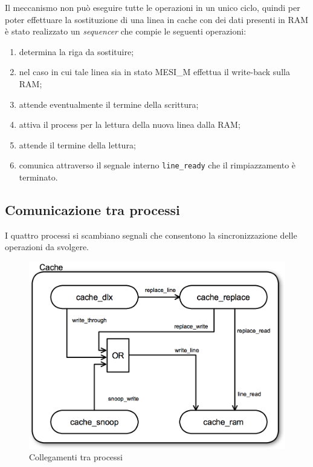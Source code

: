 Il meccanismo non pu\`o eseguire tutte le operazioni in un unico ciclo, quindi per poter effettuare la sostituzione di una linea in cache con dei dati presenti in RAM \`e stato realizzato un \emph{sequencer} che compie le seguenti operazioni:
\begin{enumerate}
  \item determina la riga da sostituire;
  \item nel caso in cui tale linea sia in stato MESI\_M effettua il write-back sulla RAM;
  \item attende eventualmente il termine della scrittura;
  \item attiva il process per la lettura della nuova linea dalla RAM;
  \item attende il termine della lettura;
  \item comunica attraverso il segnale interno \texttt{line\_ready} che il rimpiazzamento \`e terminato.
\end{enumerate}

\subsection{Comunicazione tra processi}

I quattro processi si scambiano segnali che consentono la sincronizzazione delle operazioni da svolgere.\\

\begin{figure}[h!]
\centering
\includegraphics[width=\textwidth]{img/cache/collegamenti1.png}
\caption{Collegamenti tra processi}
\label{fig:colleg1}
\end{figure}

